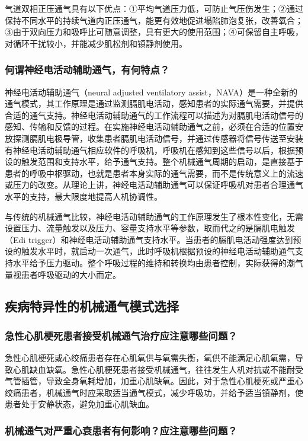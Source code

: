 气道双相正压通气具有以下优点：①平均气道压力低，可防止气压伤发生；②通过保持不同水平的持续气道内正压通气，能更有效地促进塌陷肺泡复张，改善氧合；③由于双向压力和吸呼比可随意调整，具有更大的使用范围；④可保留自主呼吸，对循环干扰较小，并能减少肌松剂和镇静剂使用。

\subsubsection{何谓神经电活动辅助通气，有何特点？}

神经电活动辅助通气（neural adjusted ventilatory
assist，NAVA）是一种全新的通气模式，其工作原理是通过监测膈肌电活动，感知患者的实际通气需要，并提供合适的通气支持。神经电活动辅助通气的工作流程可以描述为对膈肌电活动信号的感知、传输和反馈的过程。在实施神经电活动辅助通气之前，必须在合适的位置安放探测膈肌电极导管，收集患者膈肌电活动信号，并通过传感器将信号传送至安装有神经电活动辅助通气相应软件的呼吸机，呼吸机在感知到这些信号以后，根据预设的触发范围和支持水平，给予通气支持。整个机械通气周期的启动，是直接基于患者的呼吸中枢驱动，也就是患者本身实际的通气需要，而不是传统意义上的流速或压力的改变。从理论上讲，神经电活动辅助通气可以保证呼吸机对患者合理通气水平的支持，最大限度地提高人机协调性。

与传统的机械通气比较，神经电活动辅助通气的工作原理发生了根本性变化，无需设置压力、流量触发以及压力、容量支持水平等参数，取而代之的是膈肌电触发（Edi
trigger）和神经电活动辅助通气支持水平。当患者的膈肌电活动强度达到预设的触发水平时，就启动一次通气，此时呼吸机根据预设的神经电活动辅助通气支持水平给予压力驱动。整个呼吸过程的维持和转换均由患者控制，实际获得的潮气量视患者呼吸驱动的大小而定。

\subsection{疾病特异性的机械通气模式选择}

\subsubsection{急性心肌梗死患者接受机械通气治疗应注意哪些问题？}

急性心肌梗死或心绞痛患者存在心肌氧供与氧需失衡，氧供不能满足心肌氧需，导致心肌缺血缺氧。急性心肌梗死患者接受机械通气，往往发生人机对抗或不能耐受气管插管，导致全身氧耗增加，加重心肌缺氧。因此，对于急性心肌梗死或严重心绞痛患者，机械通气时应采取适当通气模式，减少呼吸功，并给予适当镇静剂，使患者处于安静状态，避免加重心肌缺血。

\subsubsection{机械通气对严重心衰患者有何影响？应注意哪些问题？}

